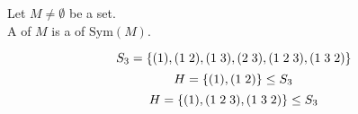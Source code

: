 \begin{frame}
  \begin{definition}
    Let $M \neq \emptyset$ be a set. \\
    A  of $M$ is a  of $\text{Sym}(M)$.
  \end{definition}

  \pause
  \[
    S_{3} = \{(1), (1\; 2), (1\; 3), (2\; 3), (1\; 2\; 3), (1\; 3\; 2)\}
  \]
  \pause
  \[
    H = \{(1), (1\; 2)\} \le S_{3}
  \]
  \pause
  \[
    H = \{(1), (1\; 2\; 3), (1\; 3\; 2)\} \le S_{3}
  \]
\end{frame}
